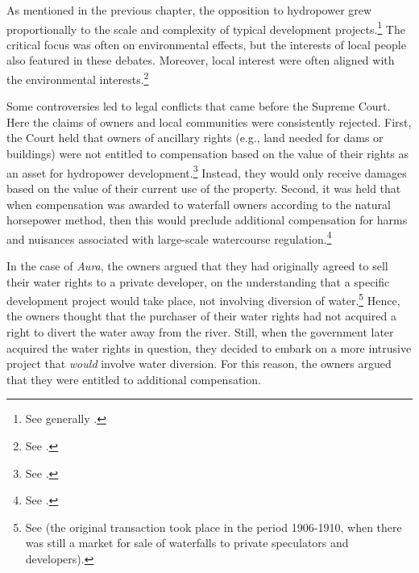 As mentioned in the previous chapter, the opposition to hydropower grew proportionally to the scale and complexity of typical development projects.\footnote{See generally \cite[64-65]{nilsen08}.} The critical focus was often on environmental effects, but the interests of local people also featured in these debates. Moreover, local interest were often aligned with the environmental interests.\footnote{See \cite[72-73]{nilsen08}.}


Some controversies led to legal conflicts that came before the Supreme Court. Here the claims of owners and local communities were consistently rejected. First, the Court held that owners of ancillary rights (e.g., land needed for dams or buildings) were not entitled to compensation based on the value of their rights as an asset for hydropower development.\footnote{See \cite[332-333]{tokke63}.} Instead, they would only receive damages based on the value of their current use of the property. Second, it was held that when compensation was awarded to waterfall owners according to the natural horsepower method, then this would preclude additional compensation for harms and nuisances associated with large-scale watercourse regulation.\footnote{See \cite{vikfalli71,driva82}.}

In the case of {\it Aura}, the owners argued that they had originally agreed to sell their water rights to a private developer, on the understanding that a specific development project would take place, not involving diversion of water.\footnote{See \cite[1284]{aura61} (the original transaction took place in the period 1906-1910, when there was still a market for sale of waterfalls to private speculators and developers).} Hence, the owners thought that the purchaser of their water rights had not acquired a right to divert the water away from the river. Still, when the government later acquired the water rights in question, they decided to embark on a more intrusive project that {\it would} involve water diversion. For this reason, the owners argued that they were entitled to additional compensation. 

